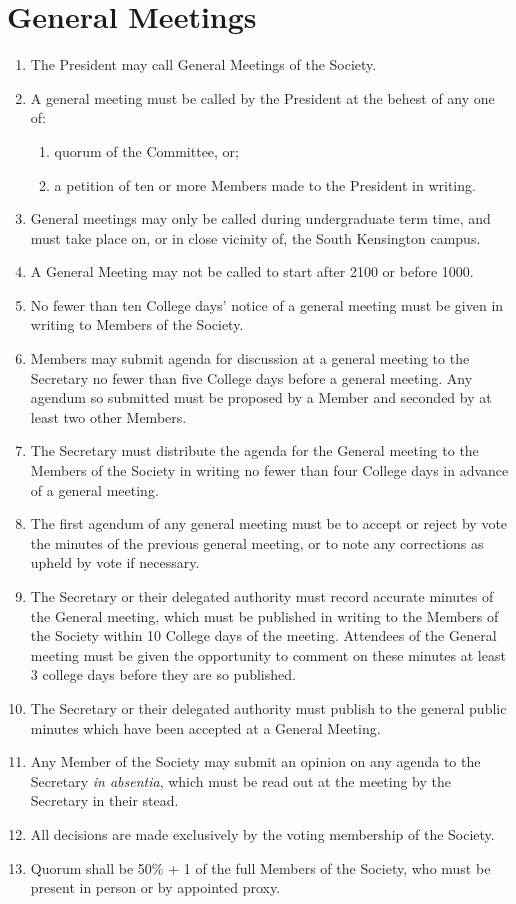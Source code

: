 \documentclass[a4paper]{tufte-handout}
\newcommand{\policyOffset}{12pt}
\newcommand{\policyCspp}[2][\policyOffset]{\marginnote[#1]{\textsc{CSP Policy \S#2}}}
\newcommand{\policyBye}[2][\policyOffset]{\marginnote[#1]{\textsc{Bye-laws \S#2}}}
\begin{document}
\section{General Meetings}
\begin{enumerate}[resume]
    \item The President may call General Meetings of the Society.
    \item \policyCspp{74} A general meeting must be called by the President at the behest of any one of:
        \begin{enumerate}
            \item quorum of the Committee, or;
            \item a petition of ten or more Members made to the President in writing.
        \end{enumerate}
    \item General meetings may only be called during undergraduate term time, and must take place on, or in close vicinity of, the South Kensington campus.
    \item A General Meeting may not be called to start after 2100 or before 1000.
    \item No fewer than ten College days' notice of a general meeting must be given in writing to Members of the Society.
    \item Members may submit agenda for discussion at a general meeting to the Secretary no fewer than five College days before a general meeting. Any agendum so submitted must be proposed by a Member and seconded by at least two other Members.
    \item The Secretary must distribute the agenda for the General meeting to the Members of the Society in writing no fewer than four College days in advance of a general meeting.
    \item The first agendum of any general meeting must be to accept or reject by vote the minutes of the previous general meeting, or to note any corrections as upheld by vote if necessary.
    \item The Secretary or their delegated authority must record accurate minutes of the General meeting, which must be published in writing to the Members of the Society within 10 College days of the meeting. Attendees of the General meeting must be given the opportunity to comment on these minutes at least 3 college days before they are so published.
    \item The Secretary or their delegated authority must publish to the general public minutes which have been accepted at a General Meeting.
    \item Any Member of the Society may submit an opinion on any agenda to the Secretary \textit{in absentia}, which must be read out at the meeting by the Secretary in their stead.
    \item All decisions are made exclusively by the voting membership of the Society.
    \item \policyBye{B11} Quorum shall be 50\% + 1 of the full Members of the Society, who must be present in person or by appointed proxy.
\end{enumerate}
\end{document}
